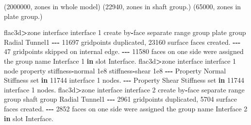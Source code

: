 \documentclass[a4paper, nobind]{templates/ociamthesis}
\newenvironment{Shaded}{\begin{snugshade}}{\end{snugshade}}
\newcommand{\BuiltInTok}[1]{#1}
\newcommand{\DecValTok}[1]{\textcolor[rgb]{0.00,0.00,0.81}{#1}}
\newcommand{\FloatTok}[1]{\textcolor[rgb]{0.00,0.00,0.81}{#1}}
\newcommand{\KeywordTok}[1]{\textcolor[rgb]{0.13,0.29,0.53}{\textbf{#1}}}
\newcommand{\NormalTok}[1]{#1}
\newcommand{\OperatorTok}[1]{\textcolor[rgb]{0.81,0.36,0.00}{\textbf{#1}}}
\newcommand{\StringTok}[1]{\textcolor[rgb]{0.31,0.60,0.02}{#1}}
\renewenvironment{Shaded}
{
  \vspace{10pt}%
  \begin{snugshade}%
}{%
  \end{snugshade}%
  \vspace{8pt}%
}
\begin{document}
\begin{Shaded}
\begin{Highlighting}[]
\NormalTok{(}\DecValTok{2000000}\NormalTok{, }\StringTok{\textquotesingle{}zones in whole model\textquotesingle{}}\NormalTok{)}
\NormalTok{(}\DecValTok{22940}\NormalTok{, }\StringTok{\textquotesingle{}zones in shaft group.\textquotesingle{}}\NormalTok{)}
\NormalTok{(}\DecValTok{65000}\NormalTok{, }\StringTok{\textquotesingle{}zones in plate group.\textquotesingle{}}\NormalTok{)}

\NormalTok{flac3d}\OperatorTok{\textgreater{}}\NormalTok{zone interface }\StringTok{\textquotesingle{}interface 1\textquotesingle{}}\NormalTok{ create by}\OperatorTok{{-}}\NormalTok{face separate }\BuiltInTok{range}\NormalTok{ group }\StringTok{\textquotesingle{}plate\textquotesingle{}}\NormalTok{ group }\StringTok{\textquotesingle{}Radial Tunnel1\textquotesingle{}}
\OperatorTok{{-}{-}{-}} \DecValTok{11697}\NormalTok{ gridpoints duplicated, }\DecValTok{23160}\NormalTok{ surface faces created.}
\OperatorTok{{-}{-}{-}} \DecValTok{47}\NormalTok{ gridpoints skipped on internal edge.}
\OperatorTok{{-}{-}{-}} \DecValTok{11580}\NormalTok{ faces on one side were assigned the group name Interface }\DecValTok{1} \KeywordTok{in}\NormalTok{ slot Interface.}
\NormalTok{flac3d}\OperatorTok{\textgreater{}}\NormalTok{zone interface }\StringTok{\textquotesingle{}interface 1\textquotesingle{}}\NormalTok{ node }\BuiltInTok{property}\NormalTok{ stiffness}\OperatorTok{{-}}\NormalTok{normal }\FloatTok{1e8}\NormalTok{ stiffness}\OperatorTok{{-}}\NormalTok{shear }\FloatTok{1e8}
\OperatorTok{{-}{-}{-}}\NormalTok{ Property Normal Stiffness }\BuiltInTok{set} \KeywordTok{in} \DecValTok{11744}\NormalTok{ interface }\DecValTok{1}\NormalTok{ nodes.}
\OperatorTok{{-}{-}{-}}\NormalTok{ Property Shear Stiffness }\BuiltInTok{set} \KeywordTok{in} \DecValTok{11744}\NormalTok{ interface }\DecValTok{1}\NormalTok{ nodes.}
\NormalTok{flac3d}\OperatorTok{\textgreater{}}\NormalTok{zone interface }\StringTok{\textquotesingle{}interface 2\textquotesingle{}}\NormalTok{ create by}\OperatorTok{{-}}\NormalTok{face separate }\BuiltInTok{range}\NormalTok{ group }\StringTok{\textquotesingle{}shaft\textquotesingle{}}\NormalTok{ group }\StringTok{\textquotesingle{}Radial Tunnel1\textquotesingle{}}
\OperatorTok{{-}{-}{-}} \DecValTok{2961}\NormalTok{ gridpoints duplicated, }\DecValTok{5704}\NormalTok{ surface faces created.}
\OperatorTok{{-}{-}{-}} \DecValTok{2852}\NormalTok{ faces on one side were assigned the group name Interface }\DecValTok{2} \KeywordTok{in}\NormalTok{ slot Interface.}

\end{Highlighting}
\end{Shaded}
\end{document}
